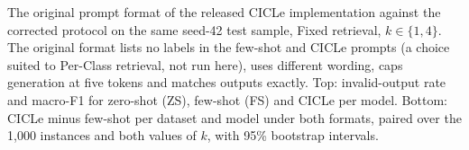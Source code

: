 \begin{table}[t]
  \centering
  \scriptsize
  \setlength{\tabcolsep}{3pt}
  \resizebox{\textwidth}{!}{}\par\medskip
  \resizebox{\textwidth}{!}{}
  \caption{The original prompt format of the released CICLe implementation against the corrected protocol on the same seed-42 test sample, Fixed retrieval, $k \in \{1, 4\}$. The original format lists no labels in the few-shot and CICLe prompts (a choice suited to Per-Class retrieval, not run here), uses different wording, caps generation at five tokens and matches outputs exactly. Top: invalid-output rate and macro-F1 for zero-shot (ZS), few-shot (FS) and CICLe per model. Bottom: CICLe minus few-shot per dataset and model under both formats, paired over the 1,000 instances and both values of $k$, with 95\% bootstrap intervals.}
  \label{tab:original}
\end{table}
